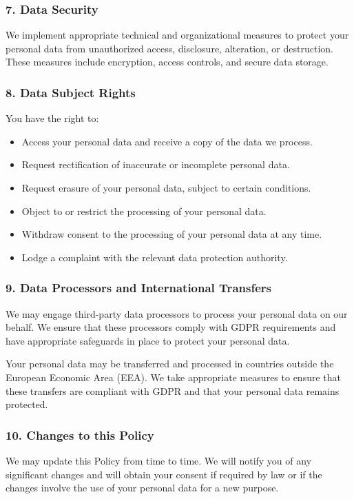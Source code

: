 \documentclass[a4paper]{article}
\begin{document}
\begin{tcolorbox}[colback=gray!20, sharp corners, boxrule=0pt, boxsep=0pt, left=5pt, right=5pt, top=5pt, bottom=5pt]
\subsubsection*{7. Data Security}
We implement appropriate technical and organizational measures to protect your personal data from unauthorized access, disclosure, alteration, or destruction. These measures include encryption, access controls, and secure data storage.

\subsubsection*{8. Data Subject Rights}
You have the right to:

\begin{itemize}
	\item Access your personal data and receive a copy of the data we process.
	\item Request rectification of inaccurate or incomplete personal data.
	\item Request erasure of your personal data, subject to certain conditions.
	\item Object to or restrict the processing of your personal data.
	\item Withdraw consent to the processing of your personal data at any time.
	\item Lodge a complaint with the relevant data protection authority.
\end{itemize}

\subsubsection*{9. Data Processors and International Transfers}
We may engage third-party data processors to process your personal data on our behalf. We ensure that these processors comply with GDPR requirements and have appropriate safeguards in place to protect your personal data.

Your personal data may be transferred and processed in countries outside the European Economic Area (EEA). We take appropriate measures to ensure that these transfers are compliant with GDPR and that your personal data remains protected.

\subsubsection*{10. Changes to this Policy}
We may update this Policy from time to time. We will notify you of any significant changes and will obtain your consent if required by law or if the changes involve the use of your personal data for a new purpose.


\end{tcolorbox}
\end{document}
